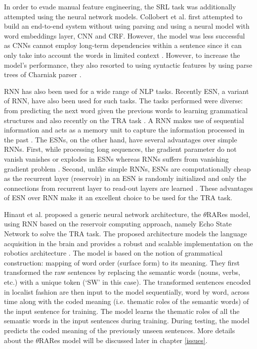 In order to evade manual feature engineering, the \acs{SRL} task was additionally attempted using the neural network models. Collobert et al. \cite{srl:collobert:2011} first attempted to build an end-to-end system without using parsing and using a neural model with word embeddings layer, \ac{CNN} and \ac{CRF}. However, the model was less successful as \acs{CNN}s cannot employ long-term dependencies within a sentence since it can only take into account the words in limited context \cite{end-to-end}. However, to increase the model's performance, they also resorted to using syntactic features by using parse trees of Charniak parser \cite{charniak_parser:2000}.

\ac{RNN} has also been used for a wide range of NLP tasks. Recently \ac{ESN}, a variant of \acs{RNN}, have also been used for such tasks. The tasks performed were diverse: from predicting the next word given the previous words to learning grammatical structures and also recently on the TRA task \cite{esn:learn_gs}. A \acs{RNN} makes use of sequential information and acts as a memory unit to capture the information processed in the past \cite{rnn:elman:1990}. The \acs{ESN}s, on the other hand, have several advantages over simple \acs{RNN}s. First, while processing long sequences, the gradient parameter do not vanish vanishes or explodes in \acs{ESN}s \cite{esn:practical_guide} whereas \acs{RNN}s suffers from vanishing gradient problem \cite{rnn:gradiant_problem:bengio}. Second, unlike simple \acs{RNN}s, \acs{ESN}s are computationally cheap as the recurrent layer (reservoir) in an \acs{ESN} is randomly initialized and only the connections from recurrent layer to read-out layers are learned \cite{esn:NIPS:2003, esn:practical_guide}. These advantages of \acs{ESN} over \acs{RNN} make it an excellent choice to be used for the TRA task.

Hinaut et al. \cite{xavier:2013:RT} proposed a generic neural network architecture, the $\theta$RARes model, using RNN based on the reservoir computing approach, namely Echo State Network to solve the TRA task. The proposed architecture models the language acquisition in the brain and provides a robust and scalable implementation on the robotics architecture \cite{xavier:2013:RT,tra:xavier_hri}.  The model is based on the notion of grammatical construction: mapping of word order (surface form) to its meaning. They first transformed the raw sentences by replacing the semantic words (nouns, verbs, etc.) with a unique token (`SW' in this case). The transformed sentences encoded in localist fashion are then input to the model sequentially, word by word, across time along with the coded meaning (i.e. thematic roles of the semantic words) of the input sentence for training. The model learns the thematic roles of all the semantic words in the input sentences during training. During testing, the model predicts the coded meaning of the previously unseen sentences. More details about the $\theta$RARes model will be discussed later in chapter \ref{issues}.

